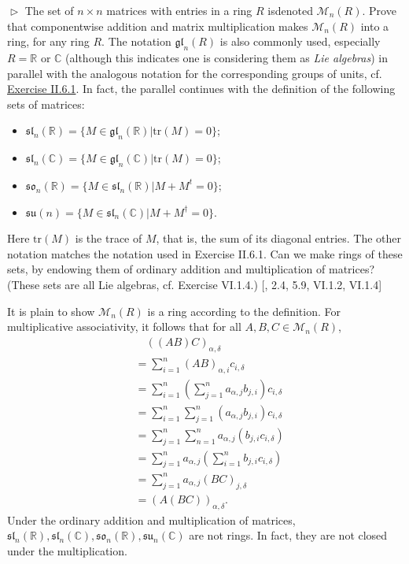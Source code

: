 \documentclass[12pt,letterpaper,boxed]{hmcpset}
\begin{document}
\hypertarget{Exercise III.1.4}{}
\begin{problem}[1.4]
	$\vartriangleright$ The set of $n\times n$ matrices with entries in a ring $R$ isdenoted $\mathcal{M}_n(R)$. Prove that componentwise addition and matrix multiplication makes $\mathcal{M}_n(R)$ into a ring, for any ring $R$. The notation $\mathfrak{gl}_n(R)$ is also commonly used, especially $R=\mathbb{R}$ or $\mathbb{C}$ (although this indicates one is considering them as \emph{Lie algebras}) in parallel with the analogous notation for the corresponding groups of units, cf. \hyperlink{Exercise II.6.1}{Exercise II.6.1}. In
	fact, the parallel continues with the definition of the following sets of matrices:
	\begin{itemize}
		\item $\mathfrak{sl}_n(\mathbb{R}) = \{M \in \mathfrak{gl}_n(\mathbb{R}) | \mathrm{tr}(M) = 0\}$;
		\item $\mathfrak{sl}_n(\mathbb{C}) = \{M \in \mathfrak{gl}_n(\mathbb{C}) | \mathrm{tr}(M) = 0\}$;
		\item $\mathfrak{so}_n(\mathbb{R}) = \{M \in \mathfrak{sl}_n(\mathbb{R}) |M +M^t = 0\}$;
		\item $\mathfrak{su}(n) = \{M \in \mathfrak{sl}_n(\mathbb{C}) |M +M^\dag = 0\}$.
	\end{itemize}
	Here $\mathrm{tr}(M)$ is the trace of $M$, that is, the sum of its diagonal entries. The other notation matches the notation used in Exercise II.6.1. Can we make rings of these sets, by endowing them of ordinary addition and multiplication of matrices? (These sets are all Lie algebras, cf. Exercise VI.1.4.) [, 2.4, 5.9, VI.1.2, VI.1.4]
\end{problem}
\begin{solution}
	It is plain to show $\mathcal{M}_n(R)$ is a ring according to the definition. For multiplicative associativity, it follows that for all $A,B,C\in\mathcal{M}_n(R)$,
	\begin{align*}
	&\hspace{1em}((A B) C)_{\alpha, \delta}\\
	&=\sum_{i=1}^{n}(A B)_{\alpha, i} c_{i, \delta}\\
	&=\sum_{i=1}^{n}\left(\sum_{j=1}^{n} a_{\alpha, j} b_{j, i}\right) c_{i, \delta}\\
	&=\sum_{i=1}^{n} \sum_{j=1}^{n}\left(a_{\alpha, j} b_{j, i}\right) c_{i, \delta}\\
	&=\sum_{j=1}^{n} \sum_{n=1}^{n} a_{\alpha, j}\left(b_{j, i} c_{i, \delta}\right)\\
	&=\sum_{j=1}^{n} a_{\alpha, j}\left(\sum_{i=1}^{n} b_{j, i} c_{i, \delta}\right)\\
	&=\sum_{j=1}^{n} a_{\alpha, j}(B C)_{j, \delta}\\
	&=(A(B C))_{\alpha, \delta}.
	\end{align*}
	Under the ordinary addition and multiplication of matrices, $\mathfrak{sl}_n(\mathbb{R}),\mathfrak{sl}_n(\mathbb{C}),\mathfrak{so}_n(\mathbb{R}),\mathfrak{su}_n(\mathbb{C})$ are not rings. In fact, they are not closed under the multiplication.
\end{solution} 
\end{document}
